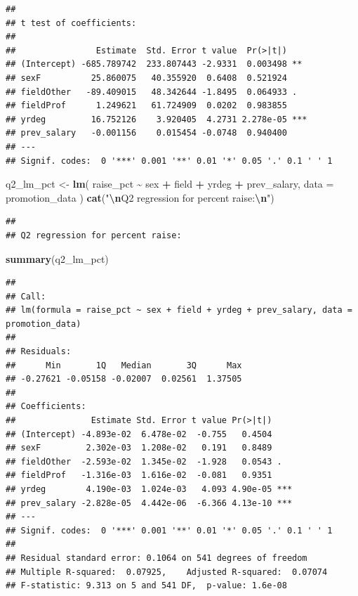\documentclass[
]{article}
\newenvironment{Shaded}{\begin{snugshade}}{\end{snugshade}}
\newcommand{\AttributeTok}[1]{\textcolor[rgb]{0.13,0.29,0.53}{#1}}
\newcommand{\FunctionTok}[1]{\textcolor[rgb]{0.13,0.29,0.53}{\textbf{#1}}}
\newcommand{\NormalTok}[1]{#1}
\newcommand{\OtherTok}[1]{\textcolor[rgb]{0.56,0.35,0.01}{#1}}
\newcommand{\SpecialCharTok}[1]{\textcolor[rgb]{0.81,0.36,0.00}{\textbf{#1}}}
\newcommand{\StringTok}[1]{\textcolor[rgb]{0.31,0.60,0.02}{#1}}
\begin{document}
\begin{verbatim}
## 
## t test of coefficients:
## 
##                Estimate  Std. Error t value  Pr(>|t|)    
## (Intercept) -685.789742  233.807443 -2.9331  0.003498 ** 
## sexF          25.860075   40.355920  0.6408  0.521924    
## fieldOther   -89.409015   48.342644 -1.8495  0.064933 .  
## fieldProf      1.249621   61.724909  0.0202  0.983855    
## yrdeg         16.752126    3.920405  4.2731 2.278e-05 ***
## prev_salary   -0.001156    0.015454 -0.0748  0.940400    
## ---
## Signif. codes:  0 '***' 0.001 '**' 0.01 '*' 0.05 '.' 0.1 ' ' 1
\end{verbatim}

\begin{Shaded}
\begin{Highlighting}[]
\NormalTok{q2\_lm\_pct }\OtherTok{\textless{}{-}} \FunctionTok{lm}\NormalTok{(}
\NormalTok{  raise\_pct }\SpecialCharTok{\textasciitilde{}}\NormalTok{ sex }\SpecialCharTok{+}\NormalTok{ field }\SpecialCharTok{+}\NormalTok{ yrdeg }\SpecialCharTok{+}\NormalTok{ prev\_salary,}
  \AttributeTok{data =}\NormalTok{ promotion\_data}
\NormalTok{)}
\FunctionTok{cat}\NormalTok{(}\StringTok{"}\SpecialCharTok{\textbackslash{}n}\StringTok{Q2 regression for percent raise:}\SpecialCharTok{\textbackslash{}n}\StringTok{"}\NormalTok{)}
\end{Highlighting}
\end{Shaded}

\begin{verbatim}
## 
## Q2 regression for percent raise:
\end{verbatim}

\begin{Shaded}
\begin{Highlighting}[]
\FunctionTok{summary}\NormalTok{(q2\_lm\_pct)}
\end{Highlighting}
\end{Shaded}

\begin{verbatim}
## 
## Call:
## lm(formula = raise_pct ~ sex + field + yrdeg + prev_salary, data = promotion_data)
## 
## Residuals:
##      Min       1Q   Median       3Q      Max 
## -0.27621 -0.05158 -0.02007  0.02561  1.37505 
## 
## Coefficients:
##               Estimate Std. Error t value Pr(>|t|)    
## (Intercept) -4.893e-02  6.478e-02  -0.755   0.4504    
## sexF         2.302e-03  1.208e-02   0.191   0.8489    
## fieldOther  -2.593e-02  1.345e-02  -1.928   0.0543 .  
## fieldProf   -1.316e-03  1.616e-02  -0.081   0.9351    
## yrdeg        4.190e-03  1.024e-03   4.093 4.90e-05 ***
## prev_salary -2.828e-05  4.442e-06  -6.366 4.13e-10 ***
## ---
## Signif. codes:  0 '***' 0.001 '**' 0.01 '*' 0.05 '.' 0.1 ' ' 1
## 
## Residual standard error: 0.1064 on 541 degrees of freedom
## Multiple R-squared:  0.07925,    Adjusted R-squared:  0.07074 
## F-statistic: 9.313 on 5 and 541 DF,  p-value: 1.6e-08
\end{verbatim}
\end{document}
